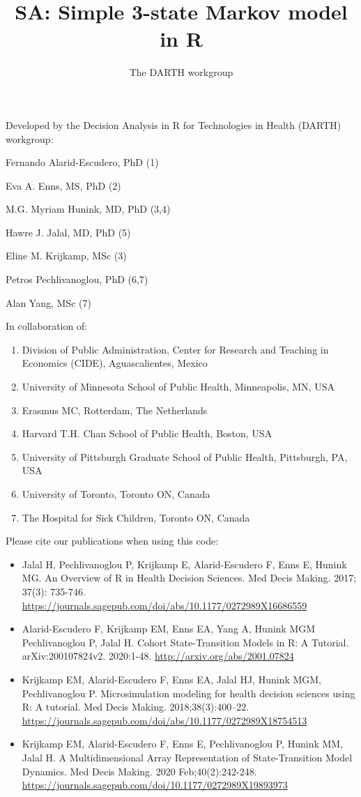 \documentclass[]{article}
\title{SA: Simple 3-state Markov model in R}
\author{The DARTH workgroup}
\date{}
\providecommand{\tightlist}{%
  \setlength{\itemsep}{0pt}\setlength{\parskip}{0pt}}
\begin{document}
\maketitle

Developed by the Decision Analysis in R for Technologies in Health
(DARTH) workgroup:

Fernando Alarid-Escudero, PhD (1)

Eva A. Enns, MS, PhD (2)

M.G. Myriam Hunink, MD, PhD (3,4)

Hawre J. Jalal, MD, PhD (5)

Eline M. Krijkamp, MSc (3)

Petros Pechlivanoglou, PhD (6,7)

Alan Yang, MSc (7)

In collaboration of:

\begin{enumerate}
\def\labelenumi{\arabic{enumi}.}
\tightlist
\item
  Division of Public Administration, Center for Research and Teaching in
  Economics (CIDE), Aguascalientes, Mexico
\item
  University of Minnesota School of Public Health, Minneapolis, MN, USA
\item
  Erasmus MC, Rotterdam, The Netherlands
\item
  Harvard T.H. Chan School of Public Health, Boston, USA
\item
  University of Pittsburgh Graduate School of Public Health, Pittsburgh,
  PA, USA
\item
  University of Toronto, Toronto ON, Canada
\item
  The Hospital for Sick Children, Toronto ON, Canada
\end{enumerate}

Please cite our publications when using this code:

\begin{itemize}
\item
  Jalal H, Pechlivanoglou P, Krijkamp E, Alarid-Escudero F, Enns E,
  Hunink MG. An Overview of R in Health Decision Sciences. Med Decis
  Making. 2017; 37(3): 735-746.
  \url{https://journals.sagepub.com/doi/abs/10.1177/0272989X16686559}
\item
  Alarid-Escudero F, Krijkamp EM, Enns EA, Yang A, Hunink MGM
  Pechlivanoglou P, Jalal H. Cohort State-Transition Models in R: A
  Tutorial. arXiv:200107824v2. 2020:1-48.
  \url{http://arxiv.org/abs/2001.07824}
\item
  Krijkamp EM, Alarid-Escudero F, Enns EA, Jalal HJ, Hunink MGM,
  Pechlivanoglou P. Microsimulation modeling for health decision
  sciences using R: A tutorial. Med Decis Making. 2018;38(3):400--22.
  \url{https://journals.sagepub.com/doi/abs/10.1177/0272989X18754513}
\item
  Krijkamp EM, Alarid-Escudero F, Enns E, Pechlivanoglou P, Hunink MM,
  Jalal H. A Multidimensional Array Representation of State-Transition
  Model Dynamics. Med Decis Making. 2020 Feb;40(2):242-248.
  \url{https://journals.sagepub.com/doi/10.1177/0272989X19893973}
\end{itemize}
\end{document}
